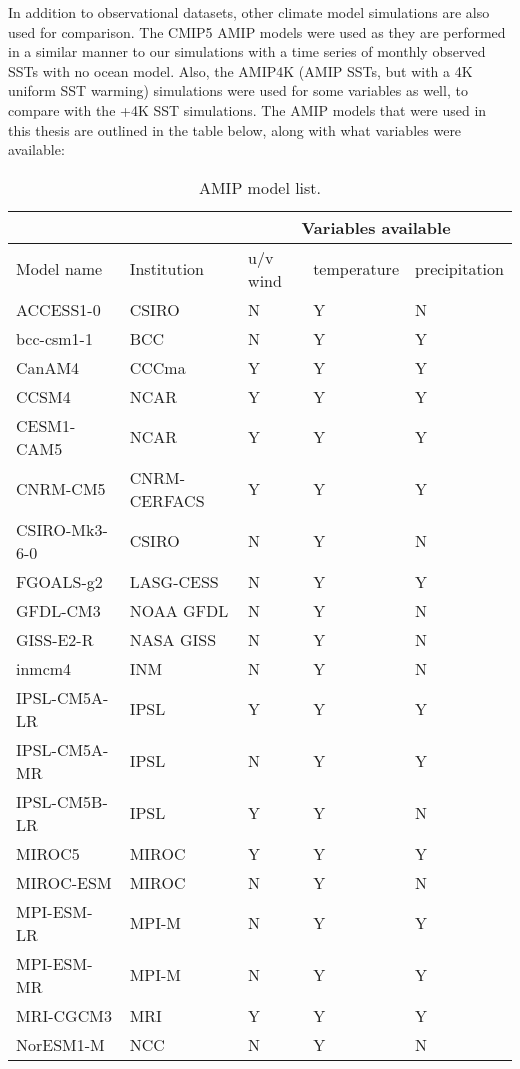 \documentclass[letterpaper,12pt,titlepage,oneside,final]{book}
\begin{document}
In addition to observational datasets, other climate model simulations are also used for comparison. The CMIP5 AMIP models were used as they are performed in a similar manner to our simulations with a time series of monthly observed SSTs with no ocean model. Also, the AMIP4K (AMIP SSTs, but with a 4K uniform SST warming) simulations were used for some variables as well, to compare with the +4K SST simulations. The AMIP models that were used in this thesis are outlined in the table below, along with what variables were available:

\begin{table}[H]
\caption{AMIP model list.}
\label{tab:amip}
\begin{tabular}{|p{4cm}||p{3.5cm}|p{2cm}|p{2.25cm}|p{2.25cm}|}
\hline
&&\multicolumn{3}{|c|}{Variables available}\\
\hline
Model name&Institution&u/v wind&temperature&precipitation\\ \hline
ACCESS1-0&CSIRO&N&Y&N\\   \hline
bcc-csm1-1&BCC&N&Y&Y\\ \hline
CanAM4&CCCma&Y&Y&Y\\ \hline
CCSM4&NCAR&Y&Y&Y\\ \hline
CESM1-CAM5&NCAR&Y&Y&Y\\ \hline
CNRM-CM5&CNRM-CERFACS&Y&Y&Y\\ \hline
CSIRO-Mk3-6-0&CSIRO&N&Y&N\\ \hline
FGOALS-g2&LASG-CESS&N&Y&Y\\ \hline
GFDL-CM3&NOAA GFDL&N&Y&N\\ \hline
GISS-E2-R&NASA GISS&N&Y&N\\ \hline
inmcm4&INM&N&Y&N\\ \hline
IPSL-CM5A-LR&IPSL&Y&Y&Y\\ \hline
IPSL-CM5A-MR&IPSL&N&Y&Y\\ \hline
IPSL-CM5B-LR&IPSL&Y&Y&N\\ \hline
MIROC5&MIROC&Y&Y&Y\\ \hline
MIROC-ESM&MIROC&N&Y&N\\ \hline
MPI-ESM-LR&MPI-M&N&Y&Y\\ \hline
MPI-ESM-MR&MPI-M&N&Y&Y\\ \hline
MRI-CGCM3&MRI&Y&Y&Y\\ \hline
NorESM1-M&NCC&N&Y&N\\ \hline

\end{tabular}
\label{tab:sites}
\end{table}
\end{document}
